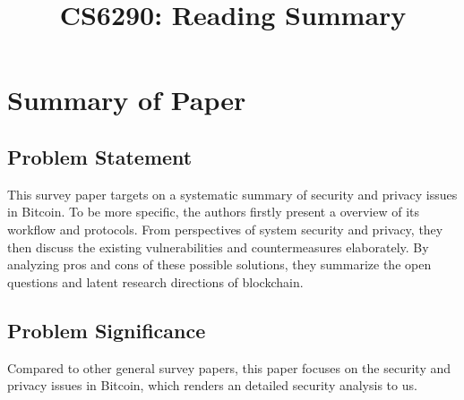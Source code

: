 \documentclass[conference]{IEEEtran}
\begin{document}
\title{CS6290: Reading Summary }

\author{
}

\maketitle

\section{Summary of Paper \cite{conti2018survey}}


\subsection{Problem Statement}
This survey paper targets on a systematic summary of security and privacy issues in Bitcoin.
%
To be more specific, the authors firstly present a overview of its workflow and protocols. 
%
From perspectives of system security and privacy, they then discuss the existing vulnerabilities and countermeasures elaborately.
%
By analyzing pros and cons of these possible solutions, they summarize the open questions and latent research directions of blockchain.

\subsection{Problem Significance}
Compared to other general survey papers, this paper focuses on the security and privacy issues in Bitcoin, which renders an detailed security analysis to us. 
\end{document}
